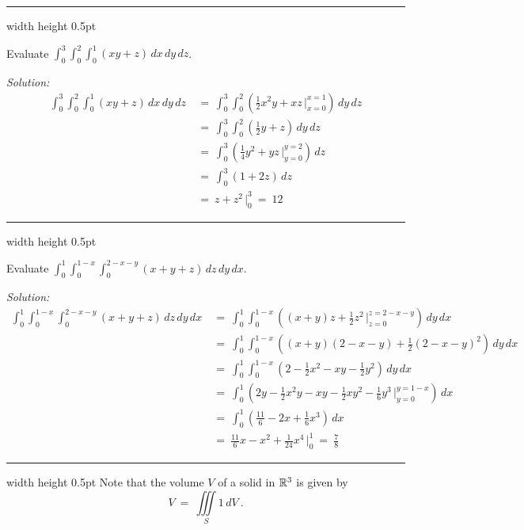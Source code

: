 \vspace{3mm}
\hrule width \textwidth height 0.5pt
\begin{exmp}
 Evaluate $\displaystyle\int_0^3 \displaystyle\int_0^2 \displaystyle\int_0^1 (xy+z) \,dx\,dy\,dz$.\vspace{1mm}
 \par\noindent \emph{Solution:}
 \begin{align*}
  \int_0^3 \int_0^2 \int_0^1 (xy+z) \,dx\,dy\,dz ~&=~
   \int_0^3 \int_0^2 \left( \tfrac{1}{2}x^2 y + xz \, \Big|_{x=0}^{x=1} \right) \,dy\,dz\\
   &=~ \int_0^3 \int_0^2 \left( \tfrac{1}{2}y + z \right) \,dy\,dz\\
   &=~ \int_0^3 \left( \tfrac{1}{4}y^2 + yz \,\Big|_{y=0}^{y=2} \right) \,dz\\
   &=~ \int_0^3 (1+2z) \,dz\\
   &=~ z + z^2 \,\Big|_0^3 ~=~ 12
 \end{align*}
\end{exmp}
\hrule width \textwidth height 0.5pt
\begin{exmp}
 Evaluate $\displaystyle\int_0^1 \displaystyle\int_0^{1-x} \displaystyle\int_0^{2-x-y} (x+y+z)\,dz\,dy\,dx$.\vspace{1mm}
 \par\noindent \emph{Solution:}
 \begin{align*}
  \int_0^1 \int_0^{1-x} \int_0^{2-x-y} (x+y+z) \,dz\,dy\,dx ~&=~
   \int_0^1 \int_0^{1-x} \left( (x+y)z+ \tfrac{1}{2}z^2 \, \Big|_{z=0}^{z=2-x-y} \right) \,dy\,dx\\
   &=~ \int_0^1 \int_0^{1-x} \left( (x+y)(2-x-y) + \tfrac{1}{2}(2-x-y)^2 \right) \,dy\,dx\\
   &=~ \int_0^1 \int_0^{1-x} \left( 2 - \tfrac{1}{2}x^2 - xy - \tfrac{1}{2}y^2 \right) \,dy\,dx\\
   &=~ \int_0^1 \left( 2y-\tfrac{1}{2}x^2 y -xy- \tfrac{1}{2}xy^2 - \tfrac{1}{6}y^3 \,\Big|_{y=0}^{y=1-x} \right) \,dx\\
   &=~ \int_0^1 \left( \tfrac{11}{6} - 2x + \tfrac{1}{6}x^3 \right) \,dx\\
   &=~ \tfrac{11}{6}x - x^2 + \tfrac{1}{24}x^4 \,\Big|_0^1 ~=~ \tfrac{7}{8}
 \end{align*}
\end{exmp}
\hrule width \textwidth height 0.5pt
\newpage
Note that the volume $V$ of a solid in $\mathbb{R}^{3}$ is given by
\begin{equation}
 V ~=~ \iiint\limits_{S} 1\,dV ~.
\end{equation}
